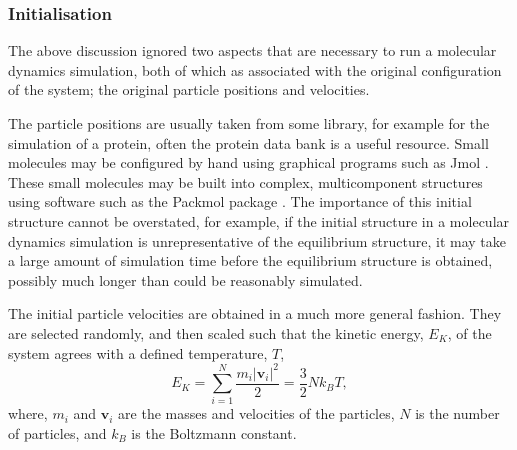 \subsubsection{Initialisation}
The above discussion ignored two aspects that are necessary to run a molecular dynamics simulation, both of which as associated with the original configuration of the system; the original particle positions and velocities.

The particle positions are usually taken from some library, for example for the simulation of a protein, often the protein data bank \cite{noauthor_rcsb_nodate} is a useful resource.
Small molecules may be configured by hand using graphical programs such as Jmol \cite{noauthor_jmol_nodate}.
These small molecules may be built into complex, multicomponent structures using software such as the Packmol package \cite{martinez_packmol_2009}.
The importance of this initial structure cannot be overstated, for example, if the initial structure in a molecular dynamics simulation is unrepresentative of the equilibrium structure, it may take a large amount of simulation time before the equilibrium structure is obtained, possibly much longer than could be reasonably simulated.

The initial particle velocities are obtained in a much more general fashion.
They are selected randomly, and then scaled such that the kinetic energy, $E_K$, of the system agrees with a defined temperature, $T$,
%
\begin{equation}
E_K = \sum_{i=1}^N{\frac{m_i|\mathbf{v}_i|^2}{2}} = \frac{3}{2}Nk_BT,
\label{equ:ek}
\end{equation}
%
where, $m_i$ and $\mathbf{v}_i$ are the masses and velocities of the particles, $N$ is the number of particles, and $k_B$ is the Boltzmann constant.

